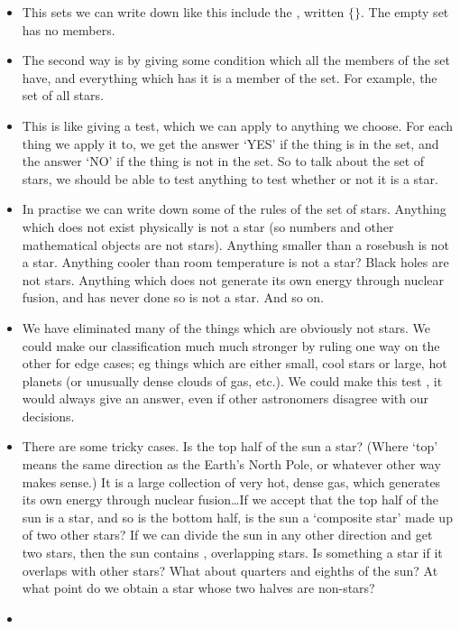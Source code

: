 \begin{itemize}
\item
This sets we can write down like this include the , written $\{\}$. The empty set has no members.
\item
The second way is by giving some condition which all the members of the set have, and everything which has it is a member of the set. For example, the set of all stars.
\item
This is like giving a test, which we can apply to anything we choose. For each thing we apply it to, we get the answer `YES' if the thing is in the set, and the answer `NO' if the thing is not in the set. So to talk about the set of stars, we should be able to test anything to test whether or not it is a star.
\item
In practise we can write down some of the rules of the set of stars. Anything which does not exist physically is not a star (so numbers and other mathematical objects are not stars). Anything smaller than a rosebush is not a star. Anything cooler than room temperature is not a star? Black holes are not stars. Anything which does not generate its own energy through nuclear fusion, and has never done so is not a star. And so on.
\item
We have eliminated many of the things which are obviously not stars. We could make our classification much much stronger by ruling one way on the other for edge cases; eg things which are either small, cool stars or large, hot planets (or unusually dense clouds of gas, etc.). We could make this test , it would always give an answer, even if other astronomers disagree with our decisions.
\item
There are some tricky cases. Is the top half of the sun a star? (Where `top' means the same direction as the Earth's North Pole, or whatever other way makes sense.) It is a large collection of very hot, dense gas, which generates its own energy through nuclear fusion\ldots If we accept that the top half of the sun is a star, and so is the bottom half, is the sun a `composite star' made up of two other stars? If we can divide the sun in any other direction and get two stars, then the sun contains , overlapping stars. Is something a star if it overlaps with other stars? What about quarters and eighths of the sun? At what point do we obtain a star whose two halves are non-stars?
\item

\end{itemize}
